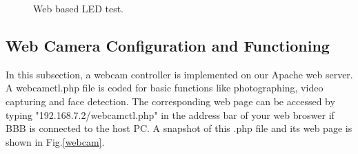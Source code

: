 \documentclass[12pt,journal,draftclsnofoot,onecolumn]{IEEEtran}
\begin{document}
\begin{figure}[ht]
	\centering
	
	\caption{Web based LED test.}\label{LEDTest}
\end{figure}

\subsection{Web Camera Configuration and Functioning}\label{Webcam}
In this subsection, a webcam controller is implemented on our Apache web server. A webcamctl.php file is coded for basic functions like photographing, video capturing and face detection. The corresponding web page can be accessed by typing "192.168.7.2/webcamctl.php" in the address bar of your web broswer if BBB is connected to the host PC.  A snapshot of this .php file and its web page is shown in Fig.\ref{webcam}.
\end{document}
